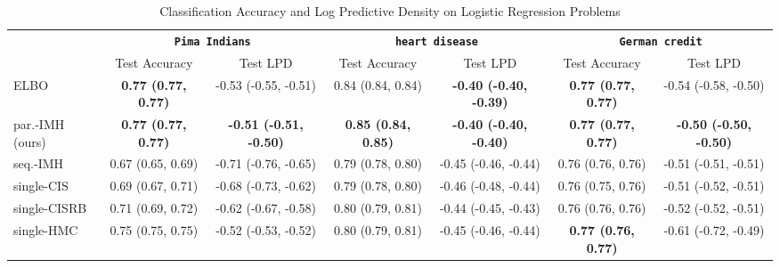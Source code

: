 
\begin{table*}
  \vspace{-0.05in}
  \centering
  \caption{Classification Accuracy and Log Predictive Density on Logistic Regression Problems}\label{table:logistic}
  \vspace{-0.05in}
  \setlength{\tabcolsep}{3pt}
  \begin{threeparttable}
  \begin{tabular}{lcccccc}
    \toprule
     & \multicolumn{2}{c}{\textbf{\texttt{Pima Indians}}} & \multicolumn{2}{c}{\textbf{\texttt{heart disease}}} & \multicolumn{2}{c}{\textbf{\texttt{German credit}}} \\
    \cmidrule(lr){2-3}\cmidrule(lr){4-5}\cmidrule(lr){6-7}
    & Test Accuracy & Test LPD
    & Test Accuracy & Test LPD
    & Test Accuracy & Test LPD \\\midrule
    ELBO & \textbf{0.77 {\scriptsize(0.77, 0.77)}} & -0.53 {\scriptsize(-0.55, -0.51)} & 0.84 {\scriptsize(0.84, 0.84)} & \textbf{-0.40 {\scriptsize(-0.40, -0.39)}} & \textbf{0.77 {\scriptsize(0.77, 0.77)}} & -0.54 {\scriptsize(-0.58, -0.50)}  \\\arrayrulecolor{black!30}\midrule
    par.-IMH (ours) & \textbf{0.77 {\scriptsize(0.77, 0.77)}} & \textbf{-0.51 {\scriptsize(-0.51, -0.50)}} & \textbf{0.85 {\scriptsize(0.84, 0.85)}} & \textbf{-0.40 {\scriptsize(-0.40, -0.40)}} & \textbf{0.77 {\scriptsize(0.77, 0.77)}} & \textbf{-0.50 {\scriptsize(-0.50, -0.50)}} \\
    seq.-IMH & 0.67 {\scriptsize(0.65, 0.69)} & -0.71 {\scriptsize(-0.76, -0.65)} & 0.79 {\scriptsize(0.78, 0.80)} & -0.45 {\scriptsize(-0.46, -0.44)} & 0.76 {\scriptsize(0.76, 0.76)} & -0.51 {\scriptsize(-0.51, -0.51)} \\
    single-CIS & 0.69 {\scriptsize(0.67, 0.71)} & -0.68 {\scriptsize(-0.73, -0.62)} & 0.79 {\scriptsize(0.78, 0.80)} & -0.46 {\scriptsize(-0.48, -0.44)} & 0.76 {\scriptsize(0.75, 0.76)} & -0.51 {\scriptsize(-0.52, -0.51)} \\
    single-CISRB & 0.71 {\scriptsize(0.69, 0.72)} & -0.62 {\scriptsize(-0.67, -0.58)} & 0.80 {\scriptsize(0.79, 0.81)} & -0.44 {\scriptsize(-0.45, -0.43)} & 0.76 {\scriptsize(0.76, 0.76)} & -0.52 {\scriptsize(-0.52, -0.51)} \\
    single-HMC & 0.75 {\scriptsize(0.75, 0.75)} & -0.52 {\scriptsize(-0.53, -0.52)} & 0.80 {\scriptsize(0.79, 0.81)} & -0.45 {\scriptsize(-0.46, -0.44)} & \textbf{0.77 {\scriptsize(0.76, 0.77)}} & -0.61 {\scriptsize(-0.72, -0.49)} \\

\end{tabular}
\end{threeparttable}
\end{table*}
